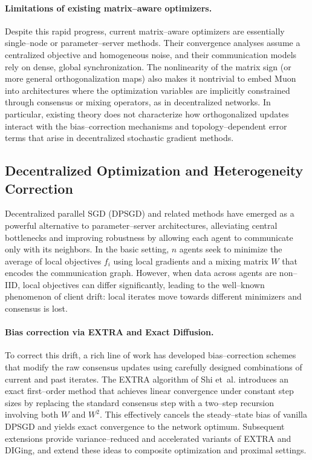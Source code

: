 \paragraph{Limitations of existing matrix–aware optimizers.}
Despite this rapid progress, current matrix–aware optimizers are essentially single–node or parameter–server methods. Their convergence analyses assume a centralized objective and homogeneous noise, and their communication models rely on dense, global synchronization. The nonlinearity of the matrix sign (or more general orthogonalization maps) also makes it nontrivial to embed Muon into architectures where the optimization variables are implicitly constrained through consensus or mixing operators, as in decentralized networks. In particular, existing theory does not characterize how orthogonalized updates interact with the bias–correction mechanisms and topology–dependent error terms that arise in decentralized stochastic gradient methods.

\subsection{Decentralized Optimization and Heterogeneity Correction}

Decentralized parallel SGD (DPSGD) and related methods have emerged as a powerful alternative to parameter–server architectures, alleviating central bottlenecks and improving robustness by allowing each agent to communicate only with its neighbors. In the basic setting, $n$ agents seek to minimize the average of local objectives $f_i$ using local gradients and a mixing matrix $W$ that encodes the communication graph. However, when data across agents are non–IID, local objectives can differ significantly, leading to the well–known phenomenon of client drift: local iterates move towards different minimizers and consensus is lost.

\paragraph{Bias correction via EXTRA and Exact Diffusion.}
To correct this drift, a rich line of work has developed bias–correction schemes that modify the raw consensus updates using carefully designed combinations of current and past iterates. The EXTRA algorithm of Shi et~al. introduces an exact first–order method that achieves linear convergence under constant step sizes by replacing the standard consensus step with a two–step recursion involving both $W$ and $W^2$. This effectively cancels the steady–state bias of vanilla DPSGD and yields exact convergence to the network optimum. Subsequent extensions provide variance–reduced and accelerated variants of EXTRA and DIGing, and extend these ideas to composite optimization and proximal settings.

